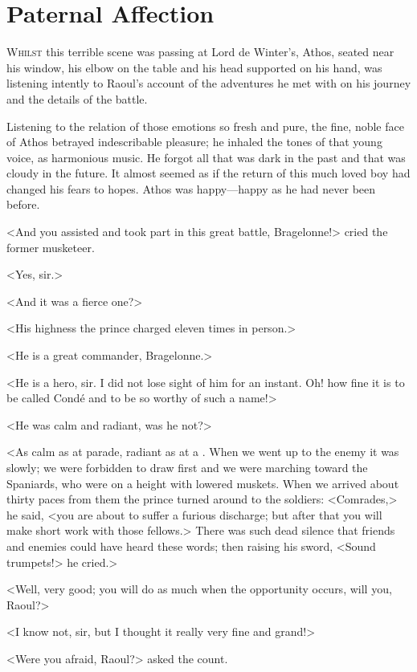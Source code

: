 \chapter{Paternal Affection}

 \lettrine{W}{hilst} this terrible scene was passing at Lord de Winter's, Athos, seated near his window, his elbow on the table and his head supported on his hand, was listening intently to Raoul's account of the adventures he met with on his journey and the details of the battle.

Listening to the relation of those emotions so fresh and pure, the fine, noble face of Athos betrayed indescribable pleasure; he inhaled the tones of that young voice, as harmonious music. He forgot all that was dark in the past and that was cloudy in the future. It almost seemed as if the return of this much loved boy had changed his fears to hopes. Athos was happy—happy as he had never been before.

<And you assisted and took part in this great battle, Bragelonne!> cried the former musketeer.

<Yes, sir.>

<And it was a fierce one?>

<His highness the prince charged eleven times in person.>

<He is a great commander, Bragelonne.>

<He is a hero, sir. I did not lose sight of him for an instant. Oh! how fine it is to be called Condé and to be so worthy of such a name!>

<He was calm and radiant, was he not?>

<As calm as at parade, radiant as at a . When we went up to the enemy it was slowly; we were forbidden to draw first and we were marching toward the Spaniards, who were on a height with lowered muskets. When we arrived about thirty paces from them the prince turned around to the soldiers: <Comrades,> he said, <you are about to suffer a furious discharge; but after that you will make short work with those fellows.> There was such dead silence that friends and enemies could have heard these words; then raising his sword, <Sound trumpets!> he cried.>

<Well, very good; you will do as much when the opportunity occurs, will you, Raoul?>

<I know not, sir, but I thought it really very fine and grand!>

<Were you afraid, Raoul?> asked the count.

